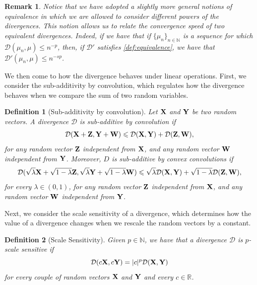 \documentclass{article}
\renewcommand{\le}{\leqslant}
\def\bZ{{\bf Z}}
\def\bX{{\bf X}}
\def\bY{{\bf Y}}
\def\bW{{\bf W}}
\def \erre{\mathbb{R}}
\def \enne{\mathbb{N}}
\newtheorem{remark}{Remark}
\newtheorem{definition}{Definition}
\begin{document}
\begin{remark}
    Notice that we have adopted a slightly more general notions of equivalence in which we are allowed to consider different powers of the divergences.
    This notion allows us to relate the convergence speed of two equivalent divergences.
    Indeed, if we have that if $\{\mu_n\}_{n\in\enne}$ is a sequence for which $\mathcal{D}(\mu_n,\mu)\le n^{-p}$, then, if $\mathcal{D}'$ satisfies \eqref{def:equivalence}, we have that $\mathcal{D}'(\mu_n,\mu)\le n^{-sp}$.
\end{remark}



We then come to how the divergence behaves under linear operations.
% 
First, we consider the sub-additivity by convolution, which regulates how the divergence behaves when we compare the sum of two random variables.



\begin{definition}[Sub-additivity by convolution]
\label{def:sub_add}
    Let $\bX$ and $\bY$ be two random vectors.
    A divergence $\mathcal{D}$ is sub-additive by convolution if 
    \begin{equation}
    \label{eq:sub_add}
        \mathcal{D}(\bX+\bZ,\bY+\bW) \le \mathcal{D}(\bX,\bY) + \mathcal{D}(\bZ,\bW),
    \end{equation}
    for any random vector $\bZ$ independent from $\bX$, and any random vector $\bW$ independent from $\bY$.
    Moreover, $D$ is sub-additive by  \textit{convex} convolutions if 
    \begin{equation}
    \label{eq:sub_add_conv}
        \mathcal{D}(\sqrt{\lambda}\bX+\sqrt{1-\lambda}\bZ,\sqrt{\lambda}\bY+\sqrt{1-\lambda}\bW) \le \sqrt{\lambda}\mathcal{D}(\bX,\bY) + \sqrt{1-\lambda}\mathcal{D}(\bZ,\bW),
    \end{equation}
    for every $\lambda\in(0,1)$, for any random vector $\bZ$ independent from $\bX$, and any random vector $\bW$ independent from $\bY$.
\end{definition}

% 
Next, we consider the scale sensitivity of a divergence, which determines how the value of a divergence changes when we rescale the random vectors by a constant.
% 

\begin{definition}[Scale Sensitivity]
    Given $p\in\enne$, we have that a divergence $\mathcal{D}$ is $p$-scale sensitive if
    \begin{equation}
        \mathcal{D}(c\bX,c\bY)=|c|^p\mathcal{D}(\bX,\bY)
    \end{equation}
    for every couple of random vectors $\bX$ and $\bY$ and every $c\in\erre$.
\end{definition}
\end{document}
